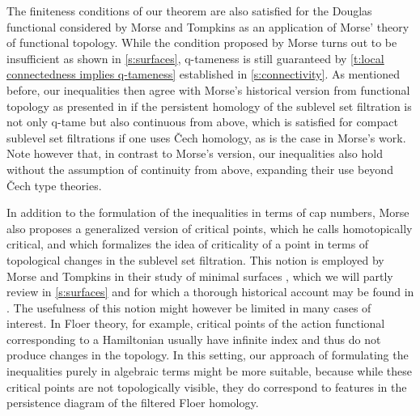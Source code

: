 The finiteness conditions of our theorem are also satisfied for the Douglas functional considered by Morse and Tompkins as an application of Morse' theory of functional topology.
While the condition proposed by Morse turns out to be insufficient as shown in \cref{s:surfaces}, q-tameness is still guaranteed by \cref{t:local connectedness implies q-tameness} established in \cref{s:connectivity}.
As mentioned before, our inequalities then agree with Morse's historical version from functional topology as presented in \cite[Corollary~12.3]{Morse.1940} if the persistent homology of the sublevel set filtration is not only q-tame but also continuous from above, which is satisfied for compact sublevel set filtrations if one uses \v{C}ech homology, as is the case in Morse's work.
Note however that, in contrast to Morse's version, our inequalities also hold without the assumption of continuity from above, expanding their use beyond \v{C}ech type theories.

\begin{rem} \label{r:homotopically critial points}
	In addition to the formulation of the inequalities in terms of cap numbers, Morse also proposes a generalized version of critical points, which he calls homotopically critical, and which formalizes the idea of criticality of a point in terms of topological changes in the sublevel set filtration.
	This notion is employed by Morse and Tompkins in their study of minimal surfaces \cite{Morse.1939}, which we will partly review in \cref{s:surfaces} and for which a thorough historical account may be found in \cite[Section II.6]{Struwe.1988}.
	The usefulness of this notion might however be limited in many cases of interest.
	In Floer theory, for example, critical points of the action functional corresponding to a Hamiltonian usually have infinite index and thus do not produce changes in the topology.
	In this setting, our approach of formulating the inequalities purely in algebraic terms might be more suitable, because while these critical points are not topologically visible, they do correspond to features in the persistence diagram of the filtered Floer homology.
\end{rem}
